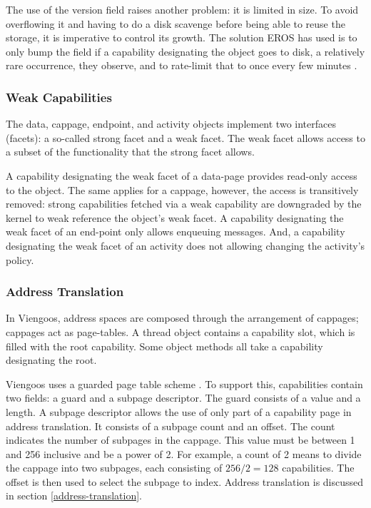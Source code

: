 The use of the version field raises another problem: it is limited in
size.  To avoid overflowing it and having to do a disk scavenge before
being able to reuse the storage, it is imperative to control its
growth.  The solution EROS has used is to only bump the field if a
capability designating the object goes to disk, a relatively rare
occurrence, they observe, and to rate-limit that to once every few
minutes \cite{citation-needed}.

\subsubsection{Weak Capabilities}

The data, cappage, endpoint, and activity objects implement two
interfaces (facets): a so-called strong facet and a weak facet.  The
weak facet allows access to a subset of the functionality that the
strong facet allows.

A capability designating the weak facet of a data-page provides
read-only access to the object.  The same applies for a cappage,
however, the access is transitively removed: strong capabilities
fetched via a weak capability are downgraded by the kernel to weak
reference the object's weak facet.  A capability designating the weak
facet of an end-point only allows enqueuing messages.  And, a
capability designating the weak facet of an activity does not allowing
changing the activity's policy.

\subsubsection{Address Translation}

In Viengoos, address spaces are composed through the arrangement of
cappages; cappages act as page-tables.  A thread object contains a
capability slot, which is filled with the root capability.  Some
object methods all take a capability designating the root.

Viengoos uses a guarded page table scheme
\cite{liedtke94page-table-structures-for-fine-grain-vm}.  To support
this, capabilities contain two fields: a guard and a subpage
descriptor.  The guard consists of a value and a length.  A subpage
descriptor allows the use of only part of a capability page in address
translation.  It consists of a subpage count and an offset.  The count
indicates the number of subpages in the cappage.  This value must be
between 1 and 256 inclusive and be a power of 2.  For example, a count
of 2 means to divide the cappage into two subpages, each consisting of
$256 / 2 = 128$ capabilities.  The offset is then used to select the
subpage to index.  Address translation is discussed in section
\ref{address-translation}.

